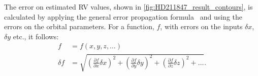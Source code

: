 The error on estimated {RV} values, shown in \cref{fig:HD211847_result_contours}, is calculated by applying the general error propagation formula~\citep{ku_notes_1966} and using the errors on the orbital parameters.
For a function, \(f\), with errors on the inputs \(\delta x\), \(\delta y\) etc., it follows:
\begin{align}
f &= f(x, y, z, \ldots)\\
\delta f &= \sqrt{{\left( \frac{\partial f}{\partial x} \delta x\right)}^2 + {\left(\frac{\partial f}{\partial y} \delta y\right)}^2 + {\left(\frac{\partial f}{\partial z} \delta z\right)}^2 + \ldots}.
\end{align}






